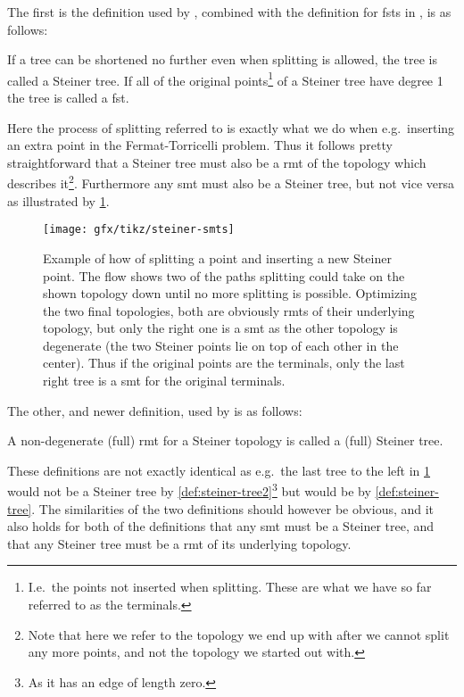 The first is the definition used by \textcite{gilbert1968}, combined with the
definition for \acp{fst} in \textcite{smith1992}, is as follows:
%
\begin{definition}
  If a tree can be shortened no further even when splitting is allowed, the tree
  is called a Steiner tree. If all of the original points\footnote{I.e.\ the
    points not inserted when splitting. These are what we have so far referred
    to as the terminals.} of a Steiner tree have degree 1 the tree is called a \acl{fst}.\label{def:steiner-tree}
\end{definition}
%
Here the process of splitting referred to is exactly what we do when e.g.\
inserting an extra point in the Fermat-Torricelli problem. Thus it follows
pretty straightforward that a Steiner tree must also be a \ac{rmt} of the
topology which describes it\footnote{Note that here we refer to the topology we
  end up with after we cannot split any more points, and not the topology we
  started out with.}. Furthermore any \ac{smt} must also be a Steiner tree, but not
vice versa as illustrated by \cref{fig:steiner-smts}.
%
\begin{figure}[htbp]
\centering
\texttt{[image: gfx/tikz/steiner-smts]}
\caption[Example of splitting and \acp{rmt}]{Example of how of splitting a
  point and inserting a new Steiner point. The flow shows two of the paths
  splitting could take on the shown topology down until no more splitting is
  possible. Optimizing the two final topologies, both are obviously \acp{rmt}
  of their underlying topology, but only the right one is a \ac{smt} as the
  other topology is degenerate (the two Steiner points lie on top of each other
  in the center). Thus if the original points are the terminals, only the last
  right tree is a \ac{smt} for the original terminals.\label{fig:steiner-smts}}
\end{figure}
%
The other, and newer definition, used by \textcite{brazil2015} is as follows:
%
\begin{definition}
  A non-degenerate (full) \ac{rmt} for a Steiner topology is called a (full)
  Steiner tree.\label{def:steiner-tree2}
\end{definition}
%
These definitions are not exactly identical as e.g.\ the last tree to the left in
\cref{fig:steiner-smts} would not be a Steiner tree by
\cref{def:steiner-tree2}\footnote{As it has an edge of length zero.}
but would be by \cref{def:steiner-tree}. The similarities of the two definitions
should however be obvious, and it also holds for both of the definitions that
any \ac{smt} must be a Steiner tree, and that any Steiner tree must be a
\ac{rmt} of its underlying topology.

